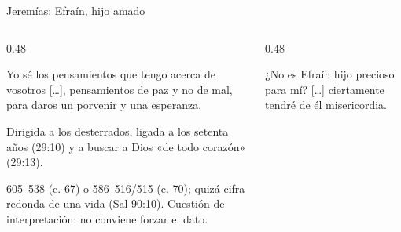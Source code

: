 \begin{frame}{Jeremías: Efraín, hijo amado}
\begin{columns}[T,onlytextwidth]
\begin{column}{0.48\textwidth}
\begin{cita}[fontupper=\scriptsize\itshape]Yo sé los pensamientos que tengo acerca de vosotros [\ldots], pensamientos de paz y no de mal, para daros un porvenir y una esperanza.\end{cita}
\footnotesize Dirigida a los desterrados, ligada a los setenta años (29:10) y a buscar a Dios «de todo corazón» (29:13).
\begin{notalam}
605--538 (c. 67) o 586--516/515 (c. 70); quizá cifra redonda de una vida (Sal 90:10). Cuestión de interpretación: no conviene forzar el dato.
\end{notalam}
\end{column}
\begin{column}{0.48\textwidth}
\par\smallskip
\begin{cita}[fontupper=\scriptsize\itshape]¿No es Efraín hijo precioso para mí? [\ldots] ciertamente tendré de él misericordia.\end{cita}
\elabpropia
\end{column}
\end{columns}
\end{frame}


